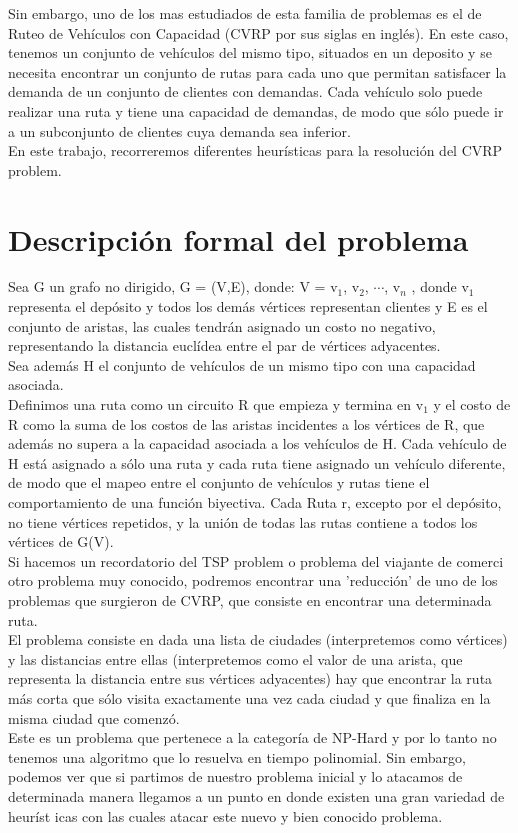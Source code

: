 \documentclass[11pt,a4paper]{article}
\begin{document}
Sin embargo, uno de los mas estudiados de esta familia de problemas es el de Ruteo de Vehículos con Capacidad (CVRP por sus siglas en inglés). En este caso, tenemos un conjunto de vehículos del mismo tipo, situados en un deposito y se necesita encontrar un conjunto de rutas para cada uno que permitan satisfacer la demanda de un conjunto de clientes con demandas. Cada vehículo solo puede realizar una ruta y tiene una capacidad de demandas, de modo que sólo puede ir a un subconjunto de clientes cuya demanda sea inferior.\\

En este trabajo, recorreremos diferentes heurísticas para la resolución del CVRP problem.\\

\section{Descripción formal del problema}

Sea G un grafo no dirigido, G = (V,E), donde:
 V = { v$_{1}$, v$_{2}$, $\cdots$, v$_{n}$ }, donde v$_{1}$ representa el depósito y todos los demás vértices representan clientes y E es el conjunto de aristas, las cuales tendrán asignado un costo no negativo, representando la distancia euclídea entre el par de vértices adyacentes. \\
Sea además H el conjunto de vehículos de un mismo tipo con una capacidad asociada.\\
Definimos una ruta como un circuito R que empieza y termina en v$_{1}$ y el costo de R como la suma de los costos de las aristas incidentes a los vértices de R, que además no supera a la capacidad asociada a los vehículos de H. Cada vehículo de H está asignado a sólo una ruta y cada ruta tiene asignado un vehículo diferente, de modo que el mapeo entre el conjunto de vehículos y rutas tiene el comportamiento de una función biyectiva. Cada Ruta r, excepto por el depósito, no tiene vértices repetidos, y la unión de todas las rutas contiene a todos los vértices de G(V).\\

Si hacemos un recordatorio del TSP problem o problema del viajante de comerci otro problema muy conocido, podremos encontrar una 'reducción' de uno de los problemas que surgieron de CVRP, que consiste en encontrar una determinada ruta. \\
El problema consiste en dada una lista de ciudades (interpretemos como vértices) y las distancias entre ellas (interpretemos como el valor de una arista, que representa la distancia entre sus vértices adyacentes) hay que encontrar la ruta más corta que sólo visita exactamente una vez cada ciudad y que finaliza en la misma ciudad que comenzó.\\
Este es un problema que pertenece a la categoría de NP-Hard y por lo tanto no tenemos una algoritmo que lo resuelva en tiempo polinomial. Sin embargo, podemos ver que si partimos de nuestro problema inicial y lo atacamos de determinada manera llegamos a un punto en donde existen una gran variedad de heuríst
icas con las cuales atacar este nuevo y bien conocido problema.
\end{document}
